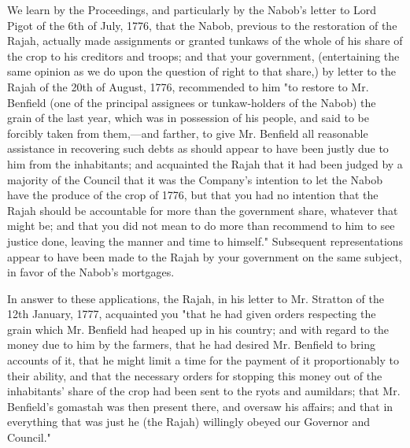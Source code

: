 We learn by the Proceedings, and particularly by the Nabob's letter to Lord Pigot of the 6th of July, 1776, that the Nabob, previous to the restoration of the Rajah, actually made assignments or granted tunkaws of the whole of his share of the crop to his creditors and troops; and that your government, (entertaining the same opinion as we do upon the question of right to that share,) by letter to the Rajah of the 20th of August, 1776, recommended to him "to restore to Mr. Benfield (one of the principal assignees or tunkaw-holders of the Nabob) the grain of the last year, which was in possession of his people, and said to be forcibly taken from them,—and farther, to give Mr. Benfield all reasonable assistance in recovering such debts as should appear to have been justly due to him from the inhabitants; and acquainted the Rajah that it had been judged by a majority of the Council that it was the Company's intention to let the Nabob have the produce of the crop of 1776, but that you had no intention that the Rajah should be accountable for more than the government share, whatever that might be; and that you did not mean to do more than recommend to him to see justice done, leaving the manner and time to himself." Subsequent representations appear to have been made to the Rajah by your government on the same subject, in favor of the Nabob's mortgages.

In answer to these applications, the Rajah, in his letter to Mr. Stratton of the 12th January, 1777, acquainted you "that he had given orders respecting the grain which Mr. Benfield had heaped up in his country; and with regard to the money due to him by the farmers, that he had desired Mr. Benfield to bring accounts of it, that he might limit a time for the payment of it proportionably to their ability, and that the necessary orders for stopping this money out of the inhabitants' share of the crop had been sent to the ryots and aumildars; that Mr. Benfield's gomastah was then present there, and oversaw his affairs; and that in everything that was just he (the Rajah) willingly obeyed our Governor and Council."

